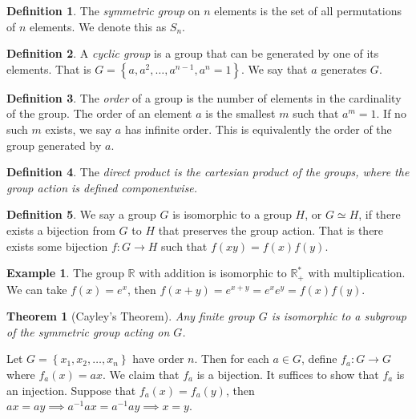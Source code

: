 \documentclass[11pt]{article}
\newtheorem{thm}{Theorem}[section]
\theoremstyle{definition}
\newtheorem{defn}{Definition}[section]
\newtheorem{example}{Example}[section]
\newcommand{\set}[1]{\left\{ #1 \right\}}
\newcommand{\RR}{\mathbb{R}}
\begin{document}
\begin{defn}
	The \emph{symmetric group} on $n$ elements is the set of all permutations of $n$
	elements. We denote this as $S_n$. 
\end{defn}

\begin{defn}
	A \emph{cyclic group} is a group that can be generated by one of its elements. That is
	$G = \set{a, a^2, \dots, a^{n-1}, a^n=1}$. We say that $a$ generates $G$.
\end{defn}


\begin{defn}
	The \emph{order} of a group is the number of elements in the cardinality of the group.
	The order of an element $a$ is the smallest $m$ such that $a^m = 1$. If no such $m$
	exists, we say $a$ has infinite order. This is equivalently the order of the group
	generated by $a$. 
\end{defn}

\begin{defn}
	The \em{direct product} is the cartesian product of the groups, where the
	group action is defined componentwise.
\end{defn}

\begin{defn}
	We say a group $G$ is isomorphic to a group $H$, or $G\simeq H$, if there exists a
	bijection from $G$ to $H$ that preserves the group action. That is there exists some
	bijection $f:G\to H$ such that $f(xy) = f(x)f(y)$.
\end{defn}

\begin{example}
	The group $\RR$ with addition is isomorphic to $\RR^*_+$ with multiplication. We can
	take $f(x)=e^x$, then $f(x+y) = e^{x+y} = e^x e^y = f(x)f(y)$. 
\end{example}

\begin{thm} [Cayley's Theorem]
	Any finite group $G$ is isomorphic to a subgroup of the symmetric group acting on $G$.
\end{thm}
\proof
Let $G = \set{x_1,x_2,\dots,x_n}$ have order $n$. Then for each $a\in G$, define
$f_a:G\to G$ where $f_a(x) = ax$. We claim that $f_a$ is a bijection. It suffices to
show that $f_a$ is an injection. Suppose that $f_a(x) = f_a(y)$, then $ax=ay \implies
a^{-1}ax=a^{-1}ay \implies x=y$.
\end{document}

